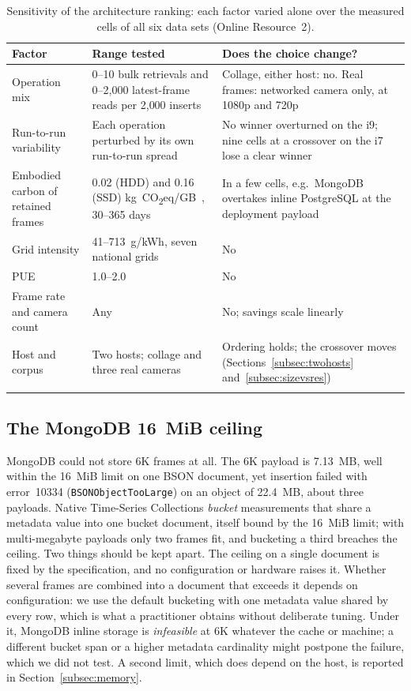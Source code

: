 \documentclass[pdflatex,sn-basic]{sn-jnl}%
\begin{document}
\begin{table}[htbp]
\color{markup}
\caption{Sensitivity of the architecture ranking: each factor varied alone over the measured cells of all six data sets (Online Resource~2).}\label{tab:robustness}
\small
\begin{tabular}{@{}L{0.2\textwidth}L{0.33\textwidth}L{0.4\textwidth}@{}}
\toprule
Factor & Range tested & Does the choice change? \\
\midrule
Operation mix & 0--10 bulk retrievals and 0--2{,}000 latest-frame reads per 2{,}000 inserts & Collage, either host: no. Real frames: networked camera only, at 1080p and 720p \\
Run-to-run variability & Each operation perturbed by its own run-to-run spread & No winner overturned on the i9; nine cells at a crossover on the i7 lose a clear winner \\
Embodied carbon of retained frames & 0.02 (HDD) and 0.16 (SSD) kg~CO\textsubscript{2}eq/GB~\citep{tannu_ssd_embodied}, 30--365 days & In a few cells, e.g.\ MongoDB overtakes inline PostgreSQL at the deployment payload \\
Grid intensity & 41--713~g/kWh, seven national grids & No \\
PUE & 1.0--2.0 & No \\
Frame rate and camera count & Any & No; savings scale linearly \\
Host and corpus & Two hosts; collage and three real cameras & Ordering holds; the crossover moves (Sections~\ref{subsec:twohosts} and~\ref{subsec:sizevsres}) \\
\botrule
\end{tabular}
\end{table}

\subsection{The MongoDB 16~MiB ceiling}\label{subsec:bson}
MongoDB could not store 6K frames at all. {\color{markup}The 6K payload is 7.13~MB, well within the 16~MiB limit on one BSON document, yet insertion failed with error~10334 (\texttt{BSONObjectTooLarge}) on an object of 22.4~MB, about three payloads.} {\color{markup}Native Time-Series Collections \emph{bucket} measurements that share a metadata value into one bucket document, itself bound by the 16~MiB limit; with multi-megabyte payloads only two frames fit, and bucketing a third breaches the ceiling.} {\color{markup}Two things should be kept apart.} {\color{markup}The ceiling on a single document is fixed by the specification, and no configuration or hardware raises it.} {\color{markup}Whether several frames are combined into a document that exceeds it depends on configuration: we use the default bucketing with one metadata value shared by every row, which is what a practitioner obtains without deliberate tuning.} {\color{markup}Under it, MongoDB inline storage is \emph{infeasible} at 6K whatever the cache or machine; a different bucket span or a higher metadata cardinality might postpone the failure, which we did not test.} {\color{markup}A second limit, which does depend on the host, is reported in Section~\ref{subsec:memory}.}
\end{document}
